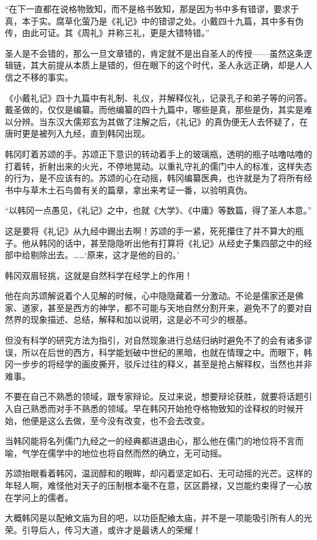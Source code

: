 “在下一直都在说格物致知，而不是格书致知，那是因为书中多有错谬，要求于真，本于实。腐草化萤乃是《礼记》中的错谬之处。小戴四十九篇，其中多有伪传，由此可证。其《周礼》并称三礼，更是大错特错。”

圣人是不会错的，那么一旦文章错的，肯定就不是出自圣人的传授——虽然这条逻辑链，其大前提从本质上是错的，但在眼下的这个时代，圣人永远正确，却是人人信之不移的事实。

《小戴礼记》四十九篇中有礼制、礼仪，并解释仪礼，记录孔子和弟子等的问答。戴圣做的，仅仅是编纂。而他编纂的四十九篇中，哪些是真，那些是伪，其实是难以分辨。当东汉大儒郑玄为其做了注解之后，《礼记》的真伪便无人去怀疑了，在唐时更是被列入九经，直到韩冈出现。

韩冈盯着苏颂的手。苏颂正下意识的转动着手上的玻璃瓶，透明的瓶子咕噜咕噜的打着转，折射出来的火光，不停地晃动。以重礼守礼的儒门中人的标准，这样失态的行为，是不应该有的。苏颂的心在动摇，韩冈编纂医典，也许就是为了将所有经书中与草木土石鸟兽有关的篇章，拿出来考证一番，以验明真伪。

“以韩冈一点愚见，《礼记》之中，也就《大学》、《中庸》等数篇，得了圣人本意。”

这是要将《礼记》从九经中踢出去啊！苏颂的手一紧，死死攥住了并不算大的瓶子。他从韩冈的话中，甚至隐隐听出他有打算将《礼记》从经史子集四部之中的经部中给剔除出去。……‘原来，这才是他的目的。’

韩冈双眉轻挑，这就是自然科学在经学上的作用！

他在向苏颂解说着个人见解的时候，心中隐隐藏着一分激动。不论是儒家还是佛家、道家，甚至是西方的神学，都不可能与天地自然分割开来，避免不了的要对自然界的现象描述、总结，解释和加以说明，这是必不可少的根基。

但没有科学的研究方法为指引，对自然现象进行总结归纳时避免不了的会有诸多谬误，所以在后世的西方，科学能划破中世纪的黑暗，也就在情理之中。而眼下，韩冈一步步的将经学的画皮撕开，驳斥过往的释义，甚至是抢占解释权，当然也并非难事。

不要在自己不熟悉的领域，跟专家辩论。反过来说，想要辩论获胜，就要将话题引入自己熟悉而对手不熟悉的领域。早在韩冈开始抢夺格物致知的诠释权的时候开始，他便是这么去做，至今没有改变，也不会去改变。

当韩冈能将名列儒门九经之一的经典都进退由心，那么他在儒门的地位将不言而喻，气学在儒学中的地位也将自然而然的确立，无可动摇。

苏颂抬眼看着韩冈，温润醇和的眼眸，却闪着坚定如石、无可动摇的光芒。这样的年轻人啊，难怪他对天子的压制根本毫不在意，区区爵禄，又岂能约束得了一心放在学问上的儒者。

大概韩冈是以配飨文庙为目的吧，以功臣配飨太庙，并不是一项能吸引所有人的光荣。引导后人，传习大道，或许才是最诱人的荣耀！


